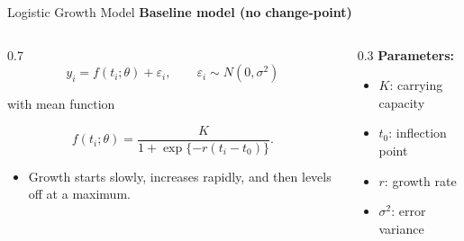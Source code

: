 \documentclass[
  ignorenonframetext,
  aspectratio=169,
]{beamer}
\providecommand{\tightlist}{%
  \setlength{\itemsep}{0pt}\setlength{\parskip}{0pt}}\usepackage{longtable,booktabs,array}
\begin{document}
\begin{frame}{Logistic Growth Model}
\label{logistic-growth-model-1}
\textbf{Baseline model (no change-point)}

\begin{columns}[T]
\begin{column}{0.7\textwidth}
\[
y_i = f(t_i;\theta) + \varepsilon_i, \qquad \varepsilon_i \sim N(0,\sigma^2)
\]

with mean function

\[
f(t_i;\theta) = \frac{K}{1 + \exp\{-r(t_i - t_0)\}}.
\]

\begin{itemize}
\tightlist
\item
  Growth starts slowly, increases rapidly, and then levels off at a
  maximum.
\end{itemize}
\end{column}

\begin{column}{0.3\textwidth}
\textbf{Parameters:}

\begin{itemize}
\tightlist
\item
  \(K\): carrying capacity
\item
  \(t_0\): inflection point
\item
  \(r\): growth rate
\item
  \(\sigma^2\): error variance
\end{itemize}
\end{column}
\end{columns}
\end{frame}
\end{document}
